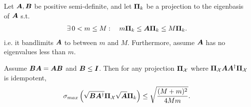 \begin{lemma}
\label{lemma:bandlimited_kantorovich}
Let $\bm{A}, \bm{B}$ be positive semi-definite, and let $\projgen{k}$ be a projection to the eigenbasis of $\bm{A}$ s.t.
\begin{equation}
    \exists\, 0<m\leq M: \quad m\projgen{k} \leq \matr{A}\projgen{k} \leq M\projgen{k}.
\end{equation}
 i.e. it bandlimits $\bm{A}$ to between $m$ and $M$. Furthermore, assume $\bm{A}$ has no eigenvalues less than $m$.
    
    Assume $\bm{B}\bm{A} = \bm{A}\bm{B}$ and $\bm{B} \leq \bm{I}$. Then for any projection $\proj{X}$ where $\proj{X}\matr{A}\matr{A}^{\dagger}\proj{X}$ is idempotent,
    \begin{equation}
\sigma_{max}\left(\sqrt{\matr{B}\matr{A}^{\dagger}}\proj{X}\sqrt{\matr{A}} \projgen{k} \right) \leq \sqrt{\frac{(M + m)^{2}}{4Mm}}.
    \end{equation}
\end{lemma}
